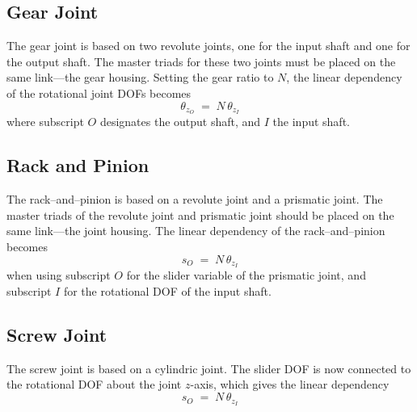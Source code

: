 \subsection{Gear Joint}

The gear joint is based on two revolute joints, one for the input shaft and one
for the output shaft.
The master triads for these two joints must be placed on the same link---the
gear housing.
Setting the gear ratio to $N$, the linear dependency of the rotational joint
DOFs becomes
%
\begin{equation}
\theta_{z_O} \;=\; N\,\theta_{z_I}
\label{eq:GearConstraint}
\end{equation}
%
where subscript $O$ designates the output shaft, and $I$ the input shaft.


\subsection{Rack and Pinion}

The rack--and--pinion is based on a revolute joint and a prismatic joint.
The master triads of the revolute joint and prismatic joint should be placed
on the same link---the joint housing.
The linear dependency of the rack--and--pinion becomes
%
\begin{equation}
s_O \;=\; N\,\theta_{z_I}
\label{eq:RackAndPinionConstraint}
\end{equation}
%
when using subscript $O$ for the slider variable of the prismatic joint,
and subscript $I$ for the rotational DOF of the input shaft.


\subsection{Screw Joint}

The screw joint is based on a cylindric joint.
The slider DOF is now connected to the rotational DOF about the joint $z$-axis,
which gives the linear dependency
%
\begin{equation}
s_O \;=\; N\,\theta_{z_I}
\label{eq:ScrewJointConstraint}
\end{equation}


